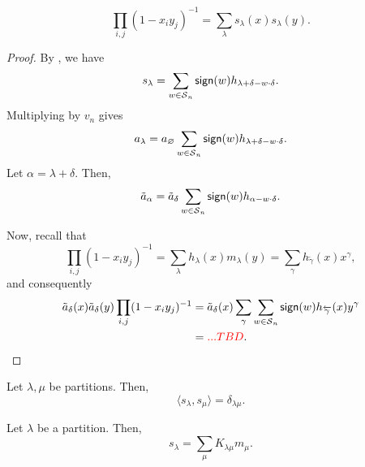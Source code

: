 \begin{theorem}
    \begin{equation}
        \prod_{i, j} (1 - x_i y_j)^{-1} = \sum_{\lambda} s_\lambda(x) s_{\lambda}(y).
    \end{equation}
\end{theorem}

\begin{proof}
    By , we have
    \begin{equation}
        s_\lambda = \sum_{w \in \operatorname{\mathcal{S}}_n} \operatorname{\mathsf{sign}}(w) h_{\lambda + \delta - w \cdot \delta}.
    \end{equation}
    Multiplying by \(v_n\) gives
    \begin{equation}
        a_\lambda = a_\varnothing \sum_{w \in \operatorname{\mathcal{S}}_n} \operatorname{\mathsf{sign}}(w) h_{\lambda + \delta - w \cdot \delta}.
    \end{equation}
    Let \(\alpha = \lambda + \delta\).
    Then,
    \begin{equation}
        \tilde{a}_\alpha = \tilde{a}_\delta \sum_{w \in \operatorname{\mathcal{S}}_n} \operatorname{\mathsf{sign}}(w) h_{\alpha - w \cdot \delta}.
    \end{equation}

    Now, recall that
    \begin{equation}
        \prod_{i, j} (1 - x_i y_j)^{-1} = \sum_{\lambda} h_\lambda(x) m_\lambda(y) = \sum_{\gamma} h_{\overleftarrow{\gamma}}(x) x^\gamma,
    \end{equation}
    and consequently
    \begin{align}
        \tilde{a}_\delta(x) \tilde{a}_\delta(y) 
        \prod_{i, j} (1 - x_i y_j)^{-1}
        &= \tilde{a}_\delta(x) \sum_{\gamma} \sum_{w \in \operatorname{\mathcal{S}}_n} \operatorname{\mathsf{sign}}(w) h_{\overleftarrow{\gamma}}(x) y^{\gamma} \\
        &= \textcolor{red}{... TBD}.
    \end{align}
\end{proof}

\begin{corollary}
    Let \(\lambda, \mu\) be partitions.
    Then,
    \begin{equation}
        \langle s_\lambda, s_\mu \rangle = \delta_{\lambda \mu}.
    \end{equation}
\end{corollary}

\begin{corollary} \label{cor:schur-sum-kostka-m}
    Let \(\lambda\) be a partition.
    Then,
    \begin{equation}
        s_\lambda = \sum_{\mu} K_{\lambda \mu} m_\mu.
    \end{equation}
\end{corollary}

